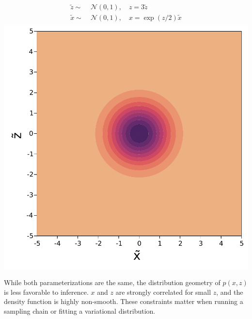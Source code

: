 \begin{minipage}{0.5\textwidth}
    \centering
    \begin{align}
        \begin{aligned}
            \tilde{z} \sim&\; \mathcal{N}(0, 1),\quad z = 3\tilde{z}\\
            \tilde{x} \sim&\; \mathcal{N}(0, 1),\quad x = \exp(z/2)\tilde{x}
        \end{aligned}
    \end{align}
    \includegraphics[width=\textwidth]{./chapters/1_introduction/figures/neals_funnel_non_centered.pdf}
    \label{fig:neals_noncentered}
\end{minipage}
\vspace{0.5cm}

While both parameterizations are the same, the distribution geometry of $p(x,z)$ is less favorable to inference.
$x$ and $z$ are strongly correlated for small $z$, and the density function is highly non-smooth.
These constraints matter when running a sampling chain or fitting a variational distribution.

